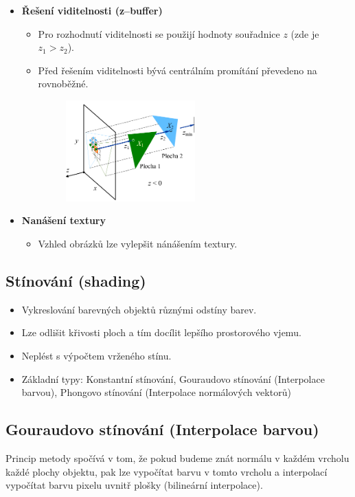 \begin{itemize}
\begin{itemize}
\begin{figure}[H]
		\end{figure}
	\end{itemize}
	\item \textbf{Řešení viditelnosti (z--buffer)}
	\begin{itemize}
		\item Pro rozhodnutí viditelnosti se použijí hodnoty souřadnice $z$ (zde je $z_1 > z_2$).
		\item Před řešením viditelnosti bývá centrálním promítání převedeno na rovnoběžné.
		\begin{figure}[H]
		\centering
		\includegraphics[width=0.5\textwidth]{assets/5_pip_zbuffer}
		\end{figure}
	\end{itemize}
	\item \textbf{Nanášení textury}
	\begin{itemize}
		\item Vzhled obrázků lze vylepšit nánášením textury.
	\end{itemize}
\end{itemize}
\subsection{Stínování (shading)}
\begin{itemize}
	\item Vykreslování barevných objektů různými odstíny barev.
	\item Lze odlišit křivosti ploch a tím docílit lepšího prostorového vjemu.
	\item Neplést s výpočtem vrženého stínu.
	\item Základní typy: Konstantní stínování, Gouraudovo stínování (Interpolace barvou), Phongovo stínování (Interpolace normálových vektorů)
\end{itemize}
\subsection{Gouraudovo stínování (Interpolace barvou)}
Princip metody spočívá v tom, že pokud budeme znát normálu v každém vrcholu každé plochy objektu, pak lze vypočítat barvu v tomto vrcholu a interpolací vypočítat barvu pixelu uvnitř plošky (bilineární interpolace).


